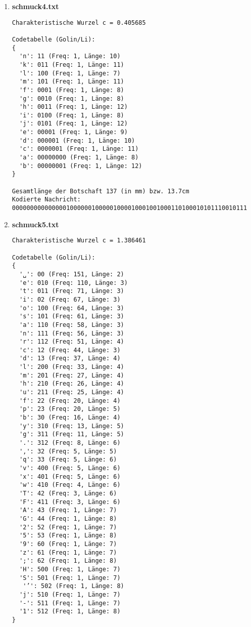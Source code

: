 \documentclass[a4paper,10pt,ngerman]{scrartcl}
\begin{document}
\begin{enumerate}
\begin{verbatim}
Gesamtlänge der Botschaft 287 (in mm) bzw. 28.7cm
Kodierte Nachricht: 0000000000000000000000000000000000000000000000000000000000000000000020001010
1010101010101010101010101010101010101010101010101010101010101012001111111111
1111111111111111111111112002012100210121122
\end{verbatim}
  \item \textbf{schmuck4.txt}
\begin{verbatim}
Charakteristische Wurzel c = 0.405685

Codetabelle (Golin/Li):
{
  'n': 11 (Freq: 1, Länge: 10)
  'k': 011 (Freq: 1, Länge: 11)
  'l': 100 (Freq: 1, Länge: 7)
  'm': 101 (Freq: 1, Länge: 11)
  'f': 0001 (Freq: 1, Länge: 8)
  'g': 0010 (Freq: 1, Länge: 8)
  'h': 0011 (Freq: 1, Länge: 12)
  'i': 0100 (Freq: 1, Länge: 8)
  'j': 0101 (Freq: 1, Länge: 12)
  'e': 00001 (Freq: 1, Länge: 9)
  'd': 000001 (Freq: 1, Länge: 10)
  'c': 0000001 (Freq: 1, Länge: 11)
  'a': 00000000 (Freq: 1, Länge: 8)
  'b': 00000001 (Freq: 1, Länge: 12)
}

Gesamtlänge der Botschaft 137 (in mm) bzw. 13.7cm
Kodierte Nachricht: 00000000000000010000001000001000010001001000110100010101110010111
\end{verbatim}
  \item \textbf{schmuck5.txt}
\begin{verbatim}
Charakteristische Wurzel c = 1.386461

Codetabelle (Golin/Li):
{
  '␣': 00 (Freq: 151, Länge: 2)
  'e': 010 (Freq: 110, Länge: 3)
  't': 011 (Freq: 71, Länge: 3)
  'i': 02 (Freq: 67, Länge: 3)
  'o': 100 (Freq: 64, Länge: 3)
  's': 101 (Freq: 61, Länge: 3)
  'a': 110 (Freq: 58, Länge: 3)
  'n': 111 (Freq: 56, Länge: 3)
  'r': 112 (Freq: 51, Länge: 4)
  'c': 12 (Freq: 44, Länge: 3)
  'd': 13 (Freq: 37, Länge: 4)
  'l': 200 (Freq: 33, Länge: 4)
  'm': 201 (Freq: 27, Länge: 4)
  'h': 210 (Freq: 26, Länge: 4)
  'u': 211 (Freq: 25, Länge: 4)
  'f': 22 (Freq: 20, Länge: 4)
  'p': 23 (Freq: 20, Länge: 5)
  'b': 30 (Freq: 16, Länge: 4)
  'y': 310 (Freq: 13, Länge: 5)
  'g': 311 (Freq: 11, Länge: 5)
  '.': 312 (Freq: 8, Länge: 6)
  ',': 32 (Freq: 5, Länge: 5)
  'q': 33 (Freq: 5, Länge: 6)
  'v': 400 (Freq: 5, Länge: 6)
  'x': 401 (Freq: 5, Länge: 6)
  'w': 410 (Freq: 4, Länge: 6)
  'T': 42 (Freq: 3, Länge: 6)
  'F': 411 (Freq: 3, Länge: 6)
  'A': 43 (Freq: 1, Länge: 7)
  'G': 44 (Freq: 1, Länge: 8)
  '2': 52 (Freq: 1, Länge: 7)
  '5': 53 (Freq: 1, Länge: 8)
  '9': 60 (Freq: 1, Länge: 7)
  'z': 61 (Freq: 1, Länge: 7)
  ';': 62 (Freq: 1, Länge: 8)
  'H': 500 (Freq: 1, Länge: 7)
  'S': 501 (Freq: 1, Länge: 7)
   '’': 502 (Freq: 1, Länge: 8)
  'j': 510 (Freq: 1, Länge: 7)
  '-': 511 (Freq: 1, Länge: 7)
  '1': 512 (Freq: 1, Länge: 8)
}


\end{verbatim}
\end{enumerate}
\end{document}
